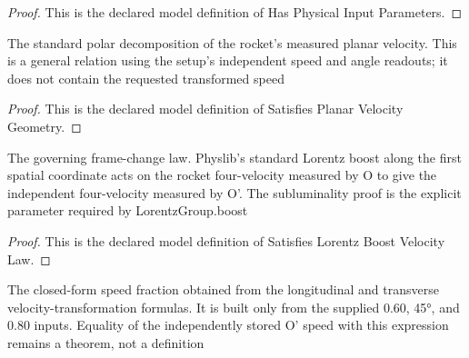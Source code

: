 \begin{proof}
  This is the declared model definition of Has Physical Input Parameters.
\end{proof}
\begin{definition}
  \label{def:physics:phyx-mini-0565:phyxminiproblems-problemphyxmini0565-satisfiesplanarvelocitygeometry}
  The standard polar decomposition of the rocket's measured planar velocity. This is a general relation using the setup's independent speed and angle readouts; it does not contain the requested transformed speed
\end{definition}
\begin{proof}
  This is the declared model definition of Satisfies Planar Velocity Geometry.
\end{proof}
\begin{definition}
  \label{def:physics:phyx-mini-0565:phyxminiproblems-problemphyxmini0565-satisfieslorentzboostvelocitylaw}
  The governing frame-change law. Physlib's standard Lorentz boost along the first spatial coordinate acts on the rocket four-velocity measured by O to give the independent four-velocity measured by O'. The subluminality proof is the explicit parameter required by LorentzGroup.boost
\end{definition}
\begin{proof}
  This is the declared model definition of Satisfies Lorentz Boost Velocity Law.
\end{proof}
\begin{definition}
  \label{def:physics:phyx-mini-0565:phyxminiproblems-problemphyxmini0565-expectedrocketspeedfractioninoprime}
  The closed-form speed fraction obtained from the longitudinal and transverse velocity-transformation formulas. It is built only from the supplied 0.60, 45°, and 0.80 inputs. Equality of the independently stored O' speed with this expression remains a theorem, not a definition
\end{definition}
